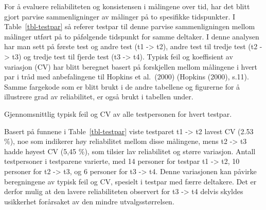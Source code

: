 \documentclass[
  letterpaper,
  DIV=11,
  numbers=noendperiod]{scrreprt}
\begin{document}
For å evaluere reliabiliteten og konsistensen i målingene over tid, har
det blitt gjort parvise sammenligninger av målinger på to spesifikke
tidspunkter. I Table~\ref{tbl-testpar} så referer testpar til denne
parvise sammenligningen mellom målinger utført på to påfølgende
tidspunkt for samme deltaker. I denne analysen har man sett på første
test og andre test (t1 -\textgreater{} t2), andre test til tredje test
(t2 -\textgreater{} t3) og tredje test til fjerde test (t3
-\textgreater{} t4). Typisk feil og koeffisient av variasjon (CV) har
blitt beregnet basert på forskjellen mellom målingene i hvert par i tråd
med anbefalingene til Hopkins et al.~(2000) (Hopkins (2000), s.11).
Samme fargekode som er blitt brukt i de andre tabellene og figurerne for
å illustrere grad av reliabilitet, er også brukt i tabellen under.

\begin{table}

\caption{\label{tbl-testpar}Gjennomsnittlig typisk feil og CV av alle
testpersonen for hvert testpar.}


\end{table}%

Basert på funnene i Table~\ref{tbl-testpar} viste testparet t1
-\textgreater{} t2 lavest CV (2.53 \%), noe som indikerer høy
reliabilitet mellom disse målingene, mens t2 -\textgreater{} t3 hadde
høyest CV (5,45 \%), som tilsier lav reliabilitet og større variasjon.
Antall testpersoner i testparene varierte, med 14 personer for testpar
t1 -\textgreater{} t2, 10 personer for t2 -\textgreater{} t3, og 6
personer for t3 -\textgreater{} t4. Denne variasjonen kan påvirke
beregningene av typisk feil og CV, spesielt i testpar med færre
deltakere. Det er derfor mulig at den lavere reliabiliteten observert
for t3 -\textgreater{} t4 delvis skyldes usikkerhet forårsaket av den
mindre utvalgsstørrelsen.
\end{document}
